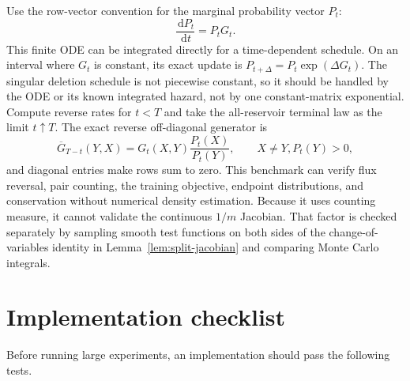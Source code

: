 \documentclass[10pt]{article}
\theoremstyle{definition}
\theoremstyle{remark}
\newcommand{\dd}{\,\mathrm{d}}
\begin{document}
Use the row-vector convention for the marginal probability vector $P_t$:
\begin{equation}
  \frac{\dd P_t}{\dd t}=P_tG_t.
  \label{eq:finite-forward-equation}
\end{equation}
This finite ODE can be integrated directly for a time-dependent schedule.
On an interval where $G_t$ is constant, its exact update is
$P_{t+\Delta}=P_t\exp(\Delta G_t)$.  The singular deletion schedule is not
piecewise constant, so it should be handled by the ODE or its known
integrated hazard, not by one constant-matrix exponential.  Compute reverse
rates for $t<T$ and take the all-reservoir terminal law as the limit
$t\uparrow T$.
The exact reverse off-diagonal generator is
\begin{equation}
  \overline G_{T-t}(Y,X)
  =G_t(X,Y)\frac{P_t(X)}{P_t(Y)},
  \qquad X\neq Y, P_t(Y)>0,
  \label{eq:finite-reverse-generator}
\end{equation}
and diagonal entries make rows sum to zero.  This benchmark can verify flux
reversal, pair counting, the training objective, endpoint distributions, and
conservation without numerical density estimation.  Because it uses counting
measure, it cannot validate the continuous $1/m$ Jacobian.  That factor is
checked separately by sampling smooth test functions on both sides of the
change-of-variables identity in Lemma~\ref{lem:split-jacobian} and comparing
Monte Carlo integrals.

\section{Implementation checklist}
\label{app:implementation-checklist}

Before running large experiments, an implementation should pass the following tests.
\end{document}
